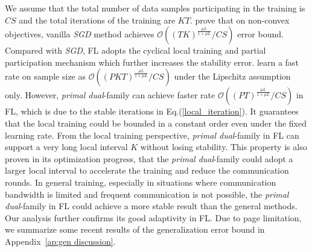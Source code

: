 \begin{remark}
We assume that the total number of data samples participating in the training is $CS$ and the total iterations of the training are $KT$. \citet{hardt2016train} prove that on non-convex objectives, vanilla \textit{SGD} method achieves $\mathcal{O}((TK)^{\frac{\mu L}{1 + \mu L}}/CS)$ error bound. Compared with \textit{SGD}, FL adopts the cyclical local training and partial participation mechanism which further increases the stability error. \citet{sun2023mode} learn a fast rate on sample size as $\mathcal{O}((PKT)^{\frac{\mu L}{1+\mu L}}/CS)$ under the Lipschitz assumption only. However, \textit{primal dual}-family can achieve faster rate $\mathcal{O}((PT)^{\frac{\mu L}{1 + \mu L}}/CS)$ in FL, which is due to the stable iterations in Eq.(\ref{local_iteration}). It guarantees that the local training could be bounded in a constant order even under the fixed learning rate. From the local training perspective, \textit{primal dual}-family in FL can support a very long local interval $K$ without losing stability. This property is also proven in its optimization progress, that the \textit{primal dual}-family could adopt a larger local interval to accelerate the training and reduce the communication rounds. In general training, especially in situations where communication bandwidth is limited and frequent communication is not possible, the \textit{primal dual}-family in FL could achieve a more stable result than the general methods. Our analysis further confirms its good adaptivity in FL. Due to page limitation, we summarize some recent results of the generalization error bound in Appendix~\ref{ap:gen discussion}.
\end{remark}